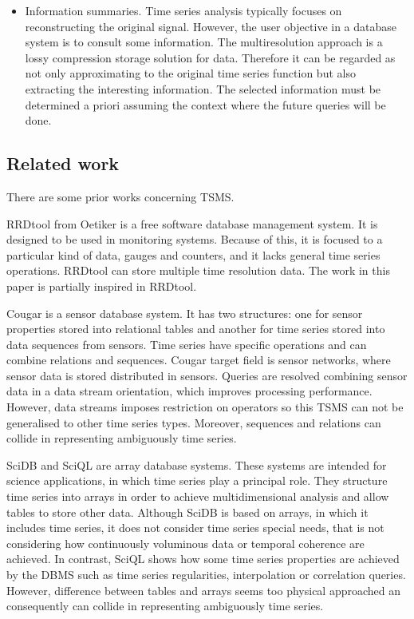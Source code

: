 \begin{itemize}
\item Information summaries. Time series analysis typically focuses on
  reconstructing the original signal. However, the user objective in a
  database system is to consult some information. The multiresolution
  approach is a lossy compression storage solution for data. Therefore
  it can be regarded as not only approximating to the
  original time series function but also extracting the interesting
  information. The selected information must be determined a priori
  assuming the context where the future queries will be done.

\end{itemize}




\subsection{Related work}

There are some prior works concerning TSMS. 

RRDtool from Oetiker \cite{rrdtool} is a free software database
management system. It is designed to be used in monitoring
systems. Because of this, it is focused to a particular kind of data,
gauges and counters, and it lacks general time series
operations. RRDtool can store multiple time resolution data. The work
in this paper is partially inspired in RRDtool.

Cougar \cite{bonnet01} is a sensor database system. It has two
structures: one for sensor properties stored into relational tables
and another for time series stored into data sequences from
sensors. Time series have specific operations and can combine
relations and sequences. Cougar target field is sensor networks, where
sensor data is stored distributed in sensors. Queries are resolved
combining sensor data in a data stream orientation, which improves
processing performance. However, data streams imposes restriction on
operators so this TSMS can not be generalised to other time series
types. Moreover, sequences and relations can collide in representing
ambiguously time series.


SciDB \cite{stonebraker09:scidb} and SciQL \cite{zhang11} are array
database systems. These systems are intended for science applications,
in which time series play a principal role. They structure time series
into arrays in order to achieve multidimensional analysis and allow
tables to store other data.  Although SciDB is based on arrays, in
which it includes time series, it does not consider time series
special needs, that is not considering how continuously voluminous
data or temporal coherence are achieved.  In contrast, SciQL shows how
some time series properties are achieved by the DBMS such as time
series regularities, interpolation or correlation queries.  However,
difference between tables and arrays seems too physical approached an
consequently can collide in representing ambiguously time series.


